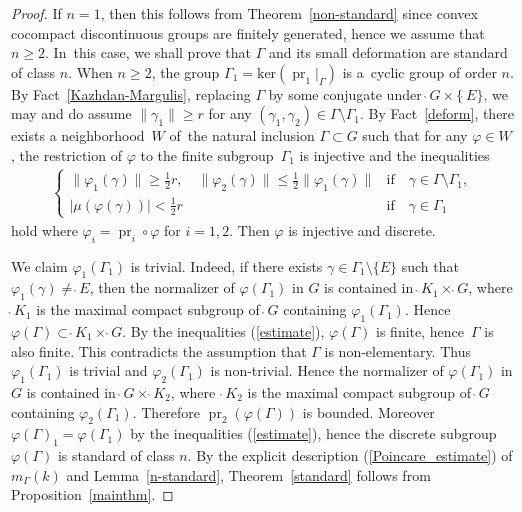 \documentclass[10pt,a4paper]{amsart}
\numberwithin{equation}{section}
\begin{document}
\begin{proof}
{\samepage If $n=1$, then this follows from Theorem~\ref{non-standard}
since convex cocompact discontinuous groups are finitely generated,
hence we assume that $n\geq 2$. In~this case, we shall prove that $\Gamma$ and its small deformation
are standard of class $n$. When $n\geq2$,
the group $\Gamma_{1}=\mathrm{ker}(\operatorname{pr}_{1}|_{\Gamma})$
is a~cyclic group of order $n$.
By Fact~\ref{Kazhdan-Margulis},
replacing $\Gamma$ by some conjugate under $\grave{\ }G\times\{\grave{\ }E\}$,
we may and do assume $\|\gamma_1\|\geq r$
for any $(\gamma_1,\gamma_2)\in\Gamma\setminus\Gamma_1$.
By Fact~\ref{deform}, there exists a neighborhood~$W$ of~the natural inclusion
$\Gamma \subset G$ such that for any $\varphi\in W$,
the restriction of $\varphi$ to the finite subgroup~$\Gamma_{1}$ is injective and the inequalities
\begin{align}
\label{estimate}
\begin{cases}
\|\varphi_{1}(\gamma)\| \geq \frac{1}{2}r,\quad
\|\varphi_{2}(\gamma)\|\leq \frac{1}{2}\|\varphi_{1}(\gamma)\| &
\text{if}\quad\gamma \in \Gamma\setminus\Gamma_1,
\\[1ex]
\left|\mu(\varphi(\gamma))\right| < \frac{1}{2}r &
\text{if}\quad\gamma \in \Gamma_1
\end{cases}
\end{align}
hold where $\varphi_{i}=\operatorname{pr}_{i}\circ\varphi$ for $i=1,2$.
Then $\varphi$ is injective and discrete.

}

We claim $\varphi_1(\Gamma_1)$ is trivial.
Indeed, if there exists $\gamma \in \Gamma_1\setminus\{E\}$
such that $\varphi_1(\gamma) \neq \grave{\ }E$, then the normalizer of
$\varphi(\Gamma_1)$ in $G$ is contained in $\grave{\ }K_1\times \grave{\ }G$, where
$\grave{\ }K_1$ is the maximal compact subgroup of $\grave{\ }G$
containing $\varphi_1(\Gamma_1)$.
Hence $\varphi(\Gamma) \subset \grave{\ }K_1\times \grave{\ }G$.
By the inequalities (\ref{estimate}),
$\varphi(\Gamma)$ is finite, hence~$\Gamma$ is also finite.
This contradicts the assumption that $\Gamma$ is non-elementary.
Thus $\varphi_1(\Gamma_1)$ is trivial and
$\varphi_2(\Gamma_1)$ is non-trivial.
Hence the normalizer of $\varphi(\Gamma_{1})$ in $G$ is contained in
$\grave{\ }G\times \grave{\ }K_{2}$,
where~$\grave{\ }K_2$ is the maximal compact subgroup of $\grave{\ }G$
containing $\varphi_2(\Gamma_1)$.
Therefore $\operatorname{pr}_{2}(\varphi(\Gamma))$ is bounded.
Moreover
$\varphi(\Gamma)_{1}=\varphi(\Gamma_1)$ by the inequalities (\ref{estimate}),
hence the discrete subgroup $\varphi(\Gamma)$ is standard of class $n$.
By the explicit description (\ref{Poincare_estimate}) of $m_{\Gamma}(k)$
and Lemma~\ref{n-standard},
Theorem~\ref{standard} follows
from Proposition~\ref{mainthm}.
\end{proof}
\end{document}
